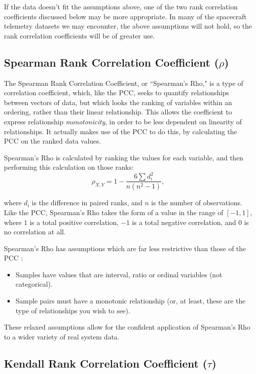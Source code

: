 If the data doesn't fit the assumptions above, one of the two rank correlation coefficients discussed below may be more appropriate. In many of the spacecraft telemetry datasets we may encounter, the above assumptions will not hold, so the rank correlation coefficients will be of greater use.

\subsection{Spearman Rank Correlation Coefficient ($\rho$)}

The Spearman Rank Correlation Coefficient, or ``Spearman's Rho," is a type of correlation coefficient, which, like the PCC, seeks to quantify relationships between vectors of data, but which looks the ranking of variables within an ordering, rather than their linear relationship. This allows the coefficient to express relationship \textit{monotonicity}, in order to be less dependent on linearity of relationships. It actually makes use of the PCC to do this, by calculating the PCC on the ranked data values.

Spearman's Rho is calculated by ranking the values for each variable, and then performing this calculation on those ranks:
\begin{equation} \label{eq:rho}
\rho_{X, Y} = 1 - \frac{6 \sum{d_{i}^{2}}}{n(n^{2}-1)},
\end{equation}

where $d_{i}$ is the difference in paired ranks, and $n$ is the number of observations. Like the PCC, Spearman's Rho takes the form of a value in the range of $[-1, 1]$, where $1$ is a total positive correlation, $-1$ is a total negative correlation, and $0$ is no correlation at all.

Spearman's Rho has assumptions which are far less restrictive than those of the PCC \cite{spearmans}:

\begin{itemize}
\item Samples have values that are interval, ratio or ordinal variables (not categorical).
\item Sample pairs must have a monotonic relationship (or, at least, these are the type of relationships you wish to see).
\end{itemize}

These relaxed assumptions allow for the confident application of Spearman's Rho to a wider variety of real system data.

\subsection{Kendall Rank Correlation Coefficient ($\tau$)}

